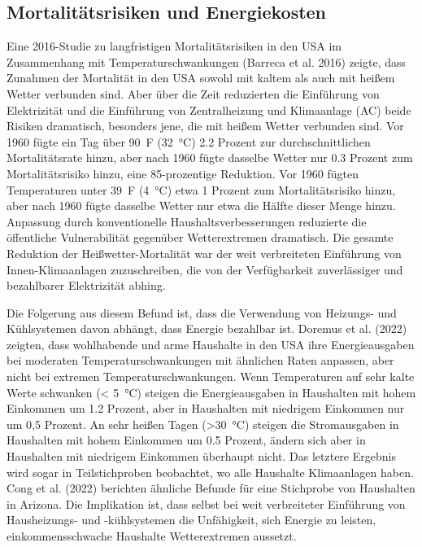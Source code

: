 \documentclass[12pt,paper=a4,DIV=12,parskip=never,chapterprefix=false,headings=standardclasses]{scrreprt}
\begin{document}
\subsection{Mortalitätsrisiken und Energiekosten}
Eine 2016-Studie zu langfristigen Mortalitätsrisiken in den USA im Zusammenhang mit Temperaturschwankungen (Barreca et al. 2016) zeigte, dass Zunahmen der Mortalität in den USA sowohl mit kaltem als auch mit heißem Wetter verbunden sind. Aber über die Zeit reduzierten die Einführung von Elektrizität und die Einführung von Zentralheizung und Klimaanlage (AC) beide Risiken dramatisch, besonders jene, die mit heißem Wetter verbunden sind. Vor 1960 fügte ein Tag über \SI{90}{F} (\SI{32}{\celsius}) 2.2 Prozent zur durchschnittlichen Mortalitätsrate hinzu, aber nach 1960 fügte dasselbe Wetter nur 0.3 Prozent zum Mortalitätsrisiko hinzu, eine 85-prozentige Reduktion. Vor 1960 fügten Temperaturen unter \SI{39}{F} (\SI{4}{\celsius}) etwa 1 Prozent zum Mortalitätsrisiko hinzu, aber nach 1960 fügte dasselbe Wetter nur etwa die Hälfte dieser Menge hinzu. Anpassung durch konventionelle Haushaltsverbesserungen reduzierte die öffentliche Vulnerabilität gegenüber Wetterextremen dramatisch. Die gesamte Reduktion der Heißwetter-Mortalität war der weit verbreiteten Einführung von Innen-Klimaanlagen zuzuschreiben, die von der Verfügbarkeit zuverlässiger und bezahlbarer Elektrizität abhing.

Die Folgerung aus diesem Befund ist, dass die Verwendung von Heizungs- und Kühlsystemen davon abhängt, dass Energie bezahlbar ist. Doremus et al. (2022) zeigten, dass wohlhabende und arme Haushalte in den USA ihre Energieausgaben bei moderaten Temperaturschwankungen mit ähnlichen Raten anpassen, aber nicht bei extremen Temperaturschwankungen. Wenn Temperaturen auf sehr kalte Werte schwanken (< \SI{5}{\celsius}) steigen die Energieausgaben in Haushalten mit hohem Einkommen um 1.2 Prozent, aber in Haushalten mit niedrigem Einkommen nur um 0,5 Prozent. An sehr heißen Tagen (>\SI{30}{\celsius}) steigen die Stromausgaben in Haushalten mit hohem Einkommen um 0.5 Prozent, ändern sich aber in Haushalten mit niedrigem Einkommen überhaupt nicht. Das letztere Ergebnis wird sogar in Teilstichproben beobachtet, wo alle Haushalte Klimaanlagen haben. Cong et al. (2022) berichten ähnliche Befunde für eine Stichprobe von Haushalten in Arizona. Die Implikation ist, dass selbst bei weit verbreiteter Einführung von Hausheizungs- und -kühlsystemen die Unfähigkeit, sich Energie zu leisten, einkommensschwache Haushalte Wetterextremen aussetzt.
\end{document}
